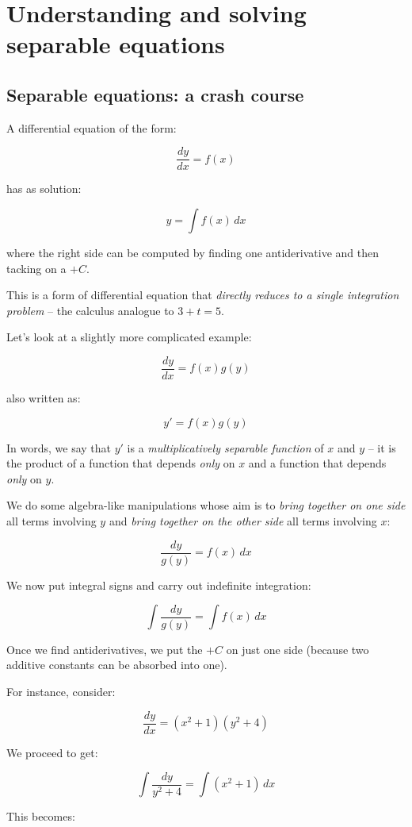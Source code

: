 \documentclass{amsart}
\begin{document}
\section{Understanding and solving separable equations}

\subsection{Separable equations: a crash course}

A differential equation of the form:

$$\frac{dy}{dx} = f(x)$$

has as solution:

$$y = \int f(x) \, dx$$

where the right side can be computed by finding one antiderivative and
then tacking on a $+C$.

This is a form of differential equation that {\em directly reduces to
a single integration problem} -- the calculus analogue to $3 + t = 5$. 

Let's look at a slightly more complicated example:

$$\frac{dy}{dx} = f(x)g(y)$$

also written as:

$$y' = f(x)g(y)$$

In words, we say that $y'$ is a {\em multiplicatively separable
function} of $x$ and $y$ -- it is the product of a function that
depends {\em only} on $x$ and a function that depends {\em only} on
$y$.

We do some algebra-like manipulations whose aim is to {\em bring
together on one side} all terms involving $y$ and {\em bring together
on the other side} all terms involving $x$:

$$\frac{dy}{g(y)} = f(x) \, dx$$

We now put integral signs and carry out indefinite integration:

$$\int \frac{dy}{g(y)} = \int f(x) \, dx$$

Once we find antiderivatives, we put the $+C$ on just one side
(because two additive constants can be absorbed into one).

For instance, consider:

$$\frac{dy}{dx} = (x^2 + 1)(y^2 + 4)$$

We proceed to get:

$$\int \frac{dy}{y^2 + 4} = \int (x^2 + 1) \, dx$$

This becomes:
\end{document}
